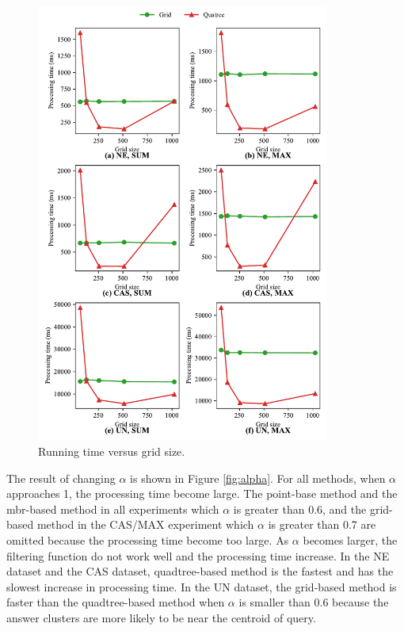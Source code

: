 \documentclass[a4paper,11pt]{report}
\theoremstyle{mytheoremstyle}
\begin{document}
\begin{figure}
    \begin{center}
        \includegraphics[width=0.86\textwidth]{matplotlib/export/gridsize.pdf}
    \end{center}
    \caption{Running time versus grid size.}
    \label{fig:gridSize}
\end{figure}

The result of changing $\alpha$ is shown in Figure \ref{fig:alpha}. For all methods, when $\alpha$ approaches 1, the processing time become large. The point-base method and the mbr-based method in all experiments which $\alpha$ is greater than 0.6, and the grid-based method in the CAS/MAX experiment which $\alpha$ is greater than 0.7 are omitted because the processing time become too large. As $\alpha$ becomes larger, the filtering function do not work well and the processing time increase. In the NE dataset and the CAS dataset, quadtree-based method is the fastest and has the slowest increase in processing time. In the UN dataset, the grid-based method is faster than the quadtree-based method when $\alpha$ is smaller than 0.6 because the answer clusters are more likely to be near the centroid of query.
\end{document}
